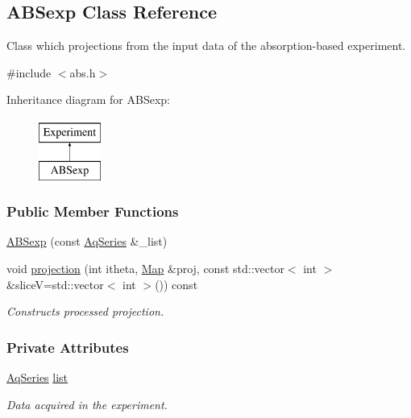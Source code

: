 \hypertarget{classABSexp}{
\subsection{ABSexp Class Reference}
\label{classABSexp}
}


Class which projections from the input data of the absorption-\/based experiment.  




{\ttfamily \#include $<$abs.h$>$}

Inheritance diagram for ABSexp:\begin{figure}[H]
\begin{center}
\leavevmode
\includegraphics[height=2.000000cm]{classABSexp}
\end{center}
\end{figure}
\subsubsection*{Public Member Functions}
\begin{DoxyCompactItemize}
\item 
\hyperlink{classABSexp_a277442b0f13160714aefdecbe349ed47}{ABSexp} (const \hyperlink{classAqSeries}{AqSeries} \&\_\-list)
\item 
void \hyperlink{classABSexp_a6f784bfb2e5e2ea0b0c51920052407c8}{projection} (int itheta, \hyperlink{group__Types_ga8747378c016fc11d9ecbb98787248c25}{Map} \&proj, const std::vector$<$ int $>$ \&sliceV=std::vector$<$ int $>$()) const 
\begin{DoxyCompactList}\small\item\em Constructs processed projection. \item\end{DoxyCompactList}\end{DoxyCompactItemize}
\subsubsection*{Private Attributes}
\begin{DoxyCompactItemize}
\item 
\hyperlink{classAqSeries}{AqSeries} \hyperlink{classABSexp_a51bc03592ad1ed4cc792bff278ab53ff}{list}
\begin{DoxyCompactList}\small\item\em Data acquired in the experiment. \item\end{DoxyCompactList}\end{DoxyCompactItemize}
